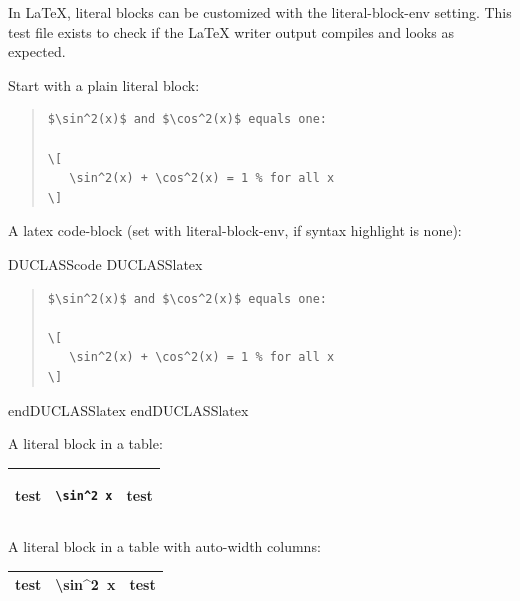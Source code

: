 \documentclass[a4paper]{article}
\newlength{\DUtablewidth} %
\newenvironment{DUclass}[1]%
  {\def\DocutilsClassFunctionName{DUCLASS#1}%
     \csname \DocutilsClassFunctionName \endcsname}%
  {\csname end\DocutilsClassFunctionName \endcsname}%
\newlength{\ttemwidth}
\begin{document}
In LaTeX, literal blocks can be customized with the \textquotedbl{}literal-block-env\textquotedbl{}
setting. This test file exists to check if the LaTeX writer output compiles
and looks as expected.

Start with a plain literal block:

\begin{quote}
\begin{Verbatim}
$\sin^2(x)$ and $\cos^2(x)$ equals one:

\[
   \sin^2(x) + \cos^2(x) = 1 % for all x
\]
\end{Verbatim}
\end{quote}

A latex \textquotedbl{}code-block\textquotedbl{} (set with \textquotedbl{}literal-block-env\textquotedbl{}, if syntax
highlight is \textquotedbl{}none\textquotedbl{}):

\begin{DUclass}{code}
\begin{DUclass}{latex}
\begin{quote}
\begin{Verbatim}
$\sin^2(x)$ and $\cos^2(x)$ equals one:

\[
   \sin^2(x) + \cos^2(x) = 1 % for all x
\]
\end{Verbatim}
\end{quote}
\end{DUclass}
\end{DUclass}

A literal block in a table:

\setlength{\DUtablewidth}{\linewidth}
\begin{longtable*}[c]{|p{0.063\DUtablewidth}|p{0.145\DUtablewidth}|p{0.063\DUtablewidth}|}
\hline

test
 & 
\begin{minipage}{8\ttemwidth}
\begin{Verbatim}
\sin^2 x
\end{Verbatim}
\end{minipage}
 & 
test
 \\
\hline
\end{longtable*}

A literal block in a table with auto-width columns:

\begin{longtable*}[c]{|l|l|l|}
\hline
test & 
\ttfamily\raggedright
\textbackslash{}sin\textasciicircum{}2~x
 & test \\
\hline
\end{longtable*}
\end{document}
